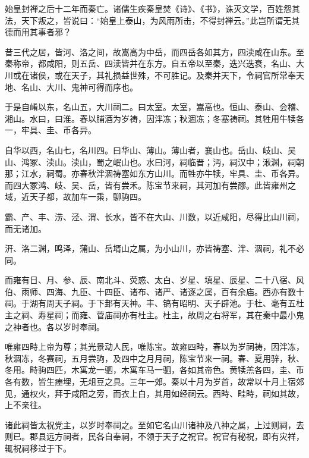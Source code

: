 \documentclass[12pt,UTF8]{ctexbook}
\begin{document}
始皇封禅之后十二年而秦亡。诸儒生疾秦皇焚《诗》、《书》，诛灭文学，百姓怨其法，天下叛之，皆说曰：“始皇上泰山，为风雨所击，不得封禅云。”此岂所谓无其德而用其事者邪？



昔三代之居，皆河、洛之间，故嵩高为中岳，而四岳各如其方，四渎咸在山东。至秦称帝，都咸阳，则五岳、四渎皆并在东方。自五帝以至秦，迭兴迭衰，名山、大川或在诸侯，或在天子，其礼损益世殊，不可胜记。及秦并天下，令祠官所常奉天地、名山、大川、鬼神可得而序也。



于是自崤以东，名山五，大川祠二。曰太室。太室，嵩高也。恒山、泰山、会稽、湘山。水曰，曰淮。春以脯酒为岁祷，因泮冻；秋涸冻；冬塞祷祠。其牲用牛犊各一，牢具、圭、币各异。



自华以西，名山七，名川四。曰华山、薄山。薄山者，襄山也。岳山、岐山、吴山、鸿冢、渎山。渎山，蜀之岷山也。水曰河，祠临晋；沔，祠汉中；湫渊，祠朝那；江水，祠蜀。亦春秋泮涸祷塞如东方山川。而牲亦牛犊，牢具、圭、币各异。而四大冢鸿、岐、吴、岳，皆有尝禾。陈宝节来祠，其河加有尝醪。此皆雍州之域，近天子都，故加车一乘，駠驹四。



霸、产、丰、涝、泾、渭、长水，皆不在大山、川数，以近咸阳，尽得比山川祠，而无诸加。



汧、洛二渊，鸣泽，蒲山、岳壻山之属，为小山川，亦皆祷塞、泮、涸祠，礼不必同。



而雍有日、月、参、辰、南北斗、荧惑、太白、岁星、填星、辰星、二十八宿、风伯、雨师、四海、九臣、十四臣、诸布、诸严、诸逐之属，百有余庙。西亦有数十祠。于湖有周天子祠。于下邽有天神。丰、镐有昭明、天子辟池。于杜、毫有五杜主之祠、寿星祠；而雍、菅庙祠亦有杜主。杜主，故周之右将军，其在秦中最小鬼之神者也。各以岁时奉祠。



唯雍四畤上帝为尊；其光景动人民，唯陈宝。故雍四畤，春以为岁祠祷，因泮冻，秋涸冻，冬赛祠，五月尝驹，及四中之月月祠，陈宝节来一祠。春、夏用骍，秋、冬用。畤驹四匹，木寓龙一驷，木寓车马一驷，各如其帝色。黄犊羔各四，圭、币各有数，皆生瘗埋，无俎豆之具。三年一郊。秦以十月为岁首，故常以十月上宿郊见，通权火，拜于咸阳之旁，而衣上白，其用如经祠云。西畤、畦畤，祠如其故，上不亲往。



诸此祠皆太祝党主，以岁时奉祠之。至如它名山川诸神及八神之属，上过则祠，去则已。郡县远方祠者，民各自奉祠，不领于天子之祝官。祝官有秘祝，即有灾祥，辄祝祠移过于下。
\end{document}
